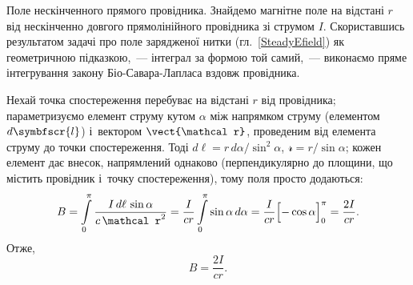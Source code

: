 \begin{Example}{Поле нескінченного прямого провідника.}
	Знайдемо магнітне поле на відстані $r$ від нескінченно довгого прямолінійного провідника
	зі струмом $I$. Скориставшись результатом задачі про поле зарядженої нитки
	(гл.~\ref{SteadyEfield}) як геометричною підказкою,~--- інтеграл за формою той самий,~---
	виконаємо пряме інтегрування закону Біо-Савара-Лапласа вздовж провідника.

	\begin{center}
		\label{tikz:long-wire}
	\end{center}

	Нехай точка спостереження перебуває на відстані $r$ від провідника; параметризуємо елемент
	струму кутом $\alpha$ між напрямком струму (елементом $d\symbfscr{l}$) і~вектором
	$\vect{\mathcal r}$, проведеним від елемента струму до точки спостереження. Тоді
	$d\ell = r\, d\alpha/\sin^2\alpha$, $\mathcal r = r/\sin\alpha$; кожен елемент дає
	внесок, напрямлений однаково (перпендикулярно до площини, що містить провідник і~точку
	спостереження), тому поля просто додаються:
	\begin{equation*}
		B = \int\limits_{0}^{\pi} \frac{I\, d\ell\, \sin\alpha}{c\,\mathcal r^2}
		= \frac{I}{cr}\int\limits_{0}^{\pi} \sin\alpha\, d\alpha
		= \frac{I}{cr}\Bigl[-\cos\alpha\Bigr]_{0}^{\pi}
		= \frac{2I}{cr}.
	\end{equation*}
	Отже,
	\begin{equation}\label{eq:InfiniteWireResult}
		B = \frac{2I}{cr}.
	\end{equation}

\end{Example}

